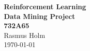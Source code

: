 \documentclass[report.tex]{subfiles}
\begin{document}
    \begin{titlepage}
        \begin{center}
            \Large\textbf{%
            \Huge Reinforcement Learning \\
            \Large Data Mining Project \\
            732A65
            } \\
            \vspace{2.5mm}
            \large Rasmus Holm \\
            \vfill
            \large \today
        \end{center}
    \end{titlepage}
\end{document}
